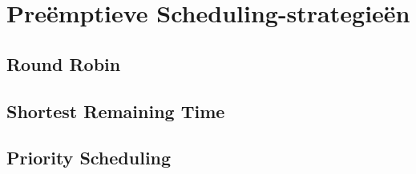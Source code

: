 \section{Pre\"emptieve Scheduling-strategie\"en}


\subsection{Round Robin}


\subsection{Shortest Remaining Time}


\subsection{Priority Scheduling}


